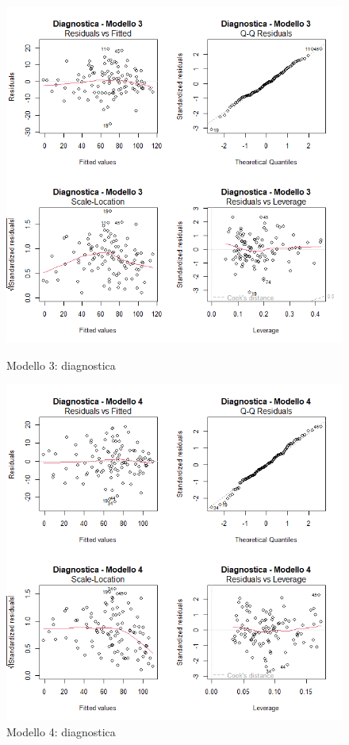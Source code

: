 \begin{figure}[H]
	\centering
	\begin{minipage}{0.48\textwidth}
		\centering
		\includegraphics[width=\linewidth]{graphs/diagnostica/modello3}
		\caption{Modello 3: diagnostica}
		\label{fig:diagnostica_modello3}
	\end{minipage}
	\hfill
	\begin{minipage}{0.48\textwidth}
		\centering
		\includegraphics[width=\linewidth]{graphs/diagnostica/modello4}
		\caption{Modello 4: diagnostica}
		\label{fig:diagnostica_modello4}
	\end{minipage}
\end{figure}

